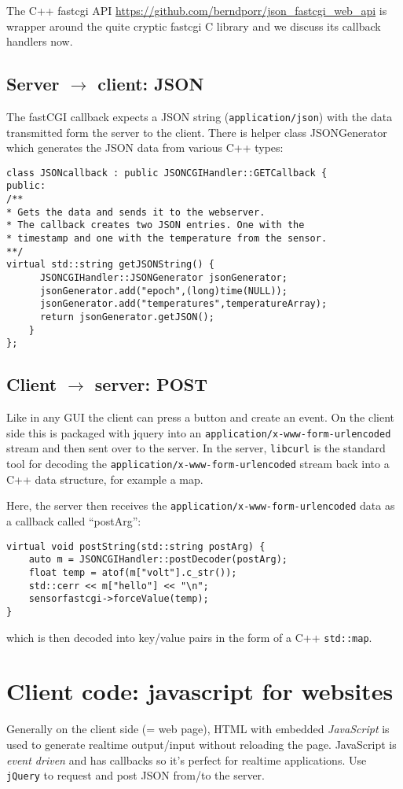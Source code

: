 \documentclass[12pt]{report}
\begin{document}
The C++ fastcgi API \url{https://github.com/berndporr/json_fastcgi_web_api} 
is wrapper around the quite cryptic fastcgi C library and we discuss
its callback handlers now.

\subsection{Server $\to$ client: JSON}
The fastCGI callback expects a JSON string (\texttt{application/json}) with the data
transmitted form the server to the client. There is helper
class JSONGenerator which generates the JSON data from various
C++ types:
\begin{verbatim}
class JSONcallback : public JSONCGIHandler::GETCallback {
public:
/**
* Gets the data and sends it to the webserver.
* The callback creates two JSON entries. One with the
* timestamp and one with the temperature from the sensor.
**/
virtual std::string getJSONString() {
      JSONCGIHandler::JSONGenerator jsonGenerator;
      jsonGenerator.add("epoch",(long)time(NULL));
      jsonGenerator.add("temperatures",temperatureArray);
      return jsonGenerator.getJSON();
    }
};
\end{verbatim} 

\subsection{Client $\to$ server: POST}
Like in any GUI the client can press a button and create an event.  On
the client side this is packaged with jquery into an
\texttt{application/x-www-form-urlencoded} stream and then sent over to the
server. In the server, \texttt{libcurl} is the standard tool for decoding
the \texttt{application/x-www-form-urlencoded} stream back into a C++ data
structure, for example a map.

Here, the server then receives the
\texttt{application/x-www-form-urlencoded} data as a callback
called ``postArg'':
\begin{verbatim}
virtual void postString(std::string postArg) {
    auto m = JSONCGIHandler::postDecoder(postArg);
    float temp = atof(m["volt"].c_str());
    std::cerr << m["hello"] << "\n";
    sensorfastcgi->forceValue(temp);
}
\end{verbatim}
which is then decoded into key/value pairs in the form of a C++ \texttt{std::map}.

\section{Client code: javascript for websites}
Generally on the client side (= web page), HTML with embedded
\textsl{JavaScript} is used to generate realtime output/input without
reloading the page. JavaScript is \textsl{event driven} and has
callbacks so it's perfect for realtime applications. Use
\texttt{jQuery} to request and post JSON from/to the server.
\end{document}
